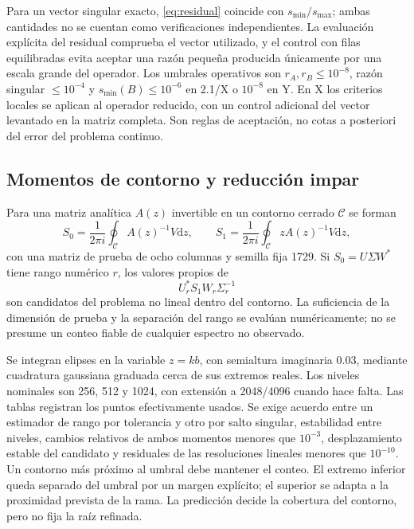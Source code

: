 \documentclass[11pt]{article}
\newcommand{\dd}{\mathrm{d}}
\begin{document}
Para un vector singular exacto, \eqref{eq:residual} coincide con $s_{\min}/s_{\max}$; ambas cantidades no se cuentan como verificaciones independientes. La evaluación explícita del residual comprueba el vector utilizado, y el control con filas equilibradas evita aceptar una razón pequeña producida únicamente por una escala grande del operador. Los umbrales operativos son $r_A,r_B\leq10^{-8}$, razón singular $\leq10^{-4}$ y $s_{\min}(B)\leq10^{-6}$ en 2.1/X o $10^{-8}$ en Y. En X los criterios locales se aplican al operador reducido, con un control adicional del vector levantado en la matriz completa. Son reglas de aceptación, no cotas a posteriori del error del problema continuo.

\subsection{Momentos de contorno y reducción impar}
Para una matriz analítica $A(z)$ invertible en un contorno cerrado $\mathcal C$ se forman \cite{Beyn2012}
\begin{equation}
 S_0=\frac{1}{2\pi i}\oint_{\mathcal C} A(z)^{-1}V\dd z,
 \qquad S_1=\frac{1}{2\pi i}\oint_{\mathcal C} zA(z)^{-1}V\dd z,\label{eq:moments}
\end{equation}
con una matriz de prueba de ocho columnas y semilla fija 1729. Si $S_0=U\Sigma W^*$ tiene rango numérico $r$, los valores propios de
\begin{equation}
 U_r^*S_1W_r\Sigma_r^{-1}\label{eq:beyn}
\end{equation}
son candidatos del problema no lineal dentro del contorno. La suficiencia de la dimensión de prueba y la separación del rango se evalúan numéricamente; no se presume un conteo fiable de cualquier espectro no observado.

Se integran elipses en la variable $z=kb$, con semialtura imaginaria 0.03, mediante cuadratura gaussiana graduada cerca de sus extremos reales. Los niveles nominales son 256, 512 y 1024, con extensión a 2048/4096 cuando hace falta. Las tablas registran los puntos efectivamente usados. Se exige acuerdo entre un estimador de rango por tolerancia y otro por salto singular, estabilidad entre niveles, cambios relativos de ambos momentos menores que $10^{-3}$, desplazamiento estable del candidato y residuales de las resoluciones lineales menores que $10^{-10}$. Un contorno más próximo al umbral debe mantener el conteo. El extremo inferior queda separado del umbral por un margen explícito; el superior se adapta a la proximidad prevista de la rama. La predicción decide la cobertura del contorno, pero no fija la raíz refinada.
\end{document}
